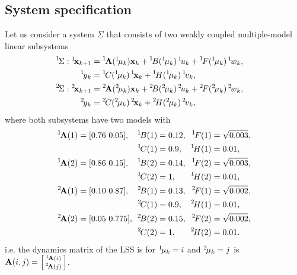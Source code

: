 \documentclass[conference,letterpaper]{IEEEtran}
\def\ist{\prescript{1\!}{}}
\def\iind{\prescript{2\!}{}}
\begin{document}
\subsection{System specification}
\label{sec:ExampleSystemSpecification}
Let us consider a system $\Sigma$ that consists of two weakly
coupled multiple-model linear subsystems
\begin{subequations}
\begin{align*}
  \hspace{-1em}
  \ist{\Sigma}: \ist{\bfx}_{k+1} &= \ist{\bfA}(\ist{\mu}_{k}) \bfx_{k} +
  \ist{B}(\ist{\mu}_{k})\ist{u}_{k} +
  \ist{F}(\ist{\mu}_{k})\ist{w}_{k},\\
  \ist{y}_k&=\ist{C}(\ist{\mu}_{k})\ist{\bfx}_{k}+\ist{H}(\ist{\mu}_{k})\ist{v}_k,\\
  \hspace{-1em}
  \iind{\Sigma}: \iind{\bfx}_{k+1} &=  \iind{\bfA}(\iind{\mu}_{k}) \bfx_{k} +
  \iind{B}(\iind{\mu}_{k})\iind{u}_{k} +
  \iind{F}(\iind{\mu}_{k})\iind{w}_{k},\\
  \iind{y}_k&=\iind{C}(\iind{\mu}_{k})\iind{\bfx}_{k}+\iind{H}(\iind{\mu}_{k})\iind{v}_k,
\end{align*}
\end{subequations}
where both subsystems have two models with%
\begin{align*}
  \ist{\bfA}(1) & = [0.76\ 0.05], & \!\!\! \ist{B}(1) & = 0.12, & \!\! \ist{F}(1) & = \sqrt{0.003},\\
                &&\!\!\!\ist{C}(1) & = 0.9,  &\!\! \ist{H}(1) & = 0.01,\\
  \ist{\bfA}(2) & = [0.86\ 0.15], & \!\!\! \ist{B}(2) & = 0.14, & \!\! \ist{F}(2) & = \sqrt{0.003},\\
                &&\!\! \ist{C}(2) & = 1,    &\!\! \ist{H}(2) & = 0.01,\\
  \iind{\bfA}(1) & = [0.10\ 0.87], &\! \!\! \iind{B}(1) & = 0.13, & \!\! \iind{F}(1) & = \sqrt{0.002},\\
                 &&\!\!\!  \iind{C}(1) & = 0.9, &\!\! \iind{H}(1) & = 0.01,\\
  \iind{\bfA}(2) & = [0.05\ 0.775], &\!\! \!\! \iind{B}(2) & = 0.15, & \!\!\! \iind{F}(2) & = \sqrt{0.002},\\
                 &&\!\!\!  \iind{C}(2) & = 1,   & \!\! \iind{H}(2) & = 0.01.
\end{align*}
i.e. the dynamics matrix of the LSS is for $\ist{\mu}_k=i$ and  $\iind{\mu}_k=j$ is
$ \bfA(i,j)=\begin{bsmallmatrix}\ist{\bfA}(i)\\\iind{\bfA}(j)\end{bsmallmatrix}$.
\end{document}
